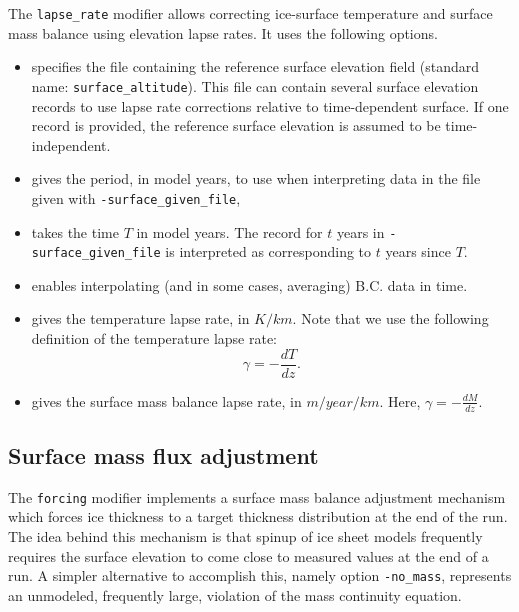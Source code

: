 \documentclass[titlepage,letterpaper,final]{scrartcl}
\def\variable#1{\texttt{#1}\index{NetCDF variables!\texttt{#1}}}
\begin{document}
The \texttt{lapse_rate} modifier allows correcting ice-surface temperature and
surface mass balance using elevation lapse rates. It uses the following
options.

\begin{itemize}
\item {} specifies the file containing the reference
  surface elevation field (standard name: \variable{surface_altitude}). This file
  can contain several surface elevation records to use lapse rate corrections
  relative to time-dependent surface. If one record is provided, the reference
  surface elevation is assumed to be time-independent.
\item {} gives the period, in model years, to
  use when interpreting data in the file given with
  \texttt{-surface_given_file},
\item {} takes the time $T$ in model
  years. The record for $t$ years in \texttt{-surface_given_file} is
  interpreted as corresponding to $t$ years since $T$.
\item {} enables interpolating (and in
  some cases, averaging) B.C. data in time.
\item {} gives the temperature lapse rate, in
  $K/km$. Note that we use the following definition of the temperature lapse
  rate:
  \begin{displaymath}
    \gamma = -\frac{dT}{dz}.
  \end{displaymath}
\item {} gives the surface mass balance lapse rate,
  in $m/year/km$. Here, $\gamma=-\frac{dM}{dz}$.
\end{itemize}

\subsection{Surface mass flux adjustment}
\label{sec:smb-adjustment}

The \texttt{forcing} modifier implements a surface mass balance adjustment
mechanism which forces ice thickness to a target thickness distribution at the
end of the run. The idea behind this mechanism is that spinup of ice sheet
models frequently requires the surface elevation to come close to measured
values at the end of a run. A simpler alternative to accomplish this, namely
option \texttt{-no_mass}, represents an unmodeled, frequently large,
violation of the mass continuity equation.
\end{document}
